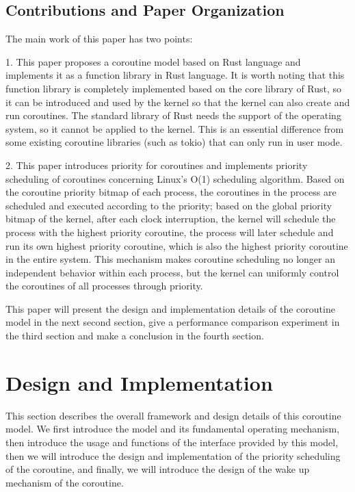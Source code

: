 \documentclass[10pt]{article}
\begin{document}
\subsection{Contributions and Paper Organization}

The main work of this paper has two points:

1. This paper proposes a coroutine model based on Rust language and implements it as a function library in Rust language. It is worth noting that this function library is completely implemented based on the core library of Rust, so it can be introduced and used by the kernel so that the kernel can also create and run coroutines. The standard library of Rust needs the support of the operating system, so it cannot be applied to the kernel. This is an essential difference from some existing coroutine libraries (such as tokio) that can only run in user mode.

2. This paper introduces priority for coroutines and implements priority scheduling of coroutines concerning Linux's O(1) scheduling algorithm. Based on the coroutine priority bitmap of each process, the coroutines in the process are scheduled and executed according to the priority; based on the global priority bitmap of the kernel, after each clock interruption, the kernel will schedule the process with the highest priority coroutine, the process will later schedule and run its own highest priority coroutine, which is also the highest priority coroutine in the entire system. This mechanism makes coroutine scheduling no longer an independent behavior within each process, but the kernel can uniformly control the coroutines of all processes through priority.

This paper will present the design and implementation details of the coroutine model in the next second section, give a performance comparison experiment in the third section and make a conclusion in the fourth section.

\section{Design and Implementation}

This section describes the overall framework and design details of this coroutine model. We first introduce the model and its fundamental operating mechanism, then introduce the usage and functions of the interface provided by this model, then we will introduce the design and implementation of the priority scheduling of the coroutine, and finally, we will introduce the design of the wake up mechanism of the coroutine.
\end{document}
